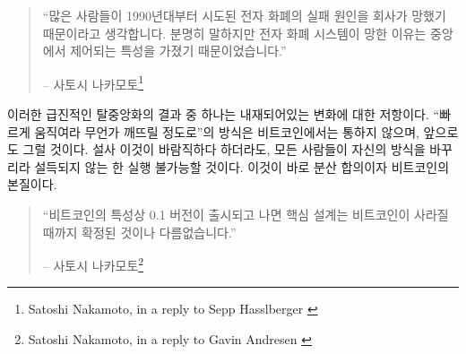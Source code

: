 \begin{quotation}\begin{samepage}
	\begin{comment}
		\enquote{A lot of people automatically dismiss e-currency as a lost cause
			because of all the companies that failed since the 1990's. I hope it's
			obvious it was only the centrally controlled nature of those systems
			that doomed them.}
		\begin{flushright} -- Satoshi Nakamoto\footnote{Satoshi Nakamoto, in a reply to Sepp Hasslberger \cite{satoshi-centralized-nature}}
		\end{comment}
		\enquote{많은 사람들이 1990년대부터 시도된 전자 화폐의 실패 원인을 회사가 망했기 때문이라고 생각합니다.
			분명히 말하지만 전자 화폐 시스템이 망한 이유는 중앙에서 제어되는 특성을 가졌기 때문이었습니다.}
		\begin{flushright} -- 사토시 나카모토\footnote{Satoshi Nakamoto, in a reply to Sepp Hasslberger \cite{satoshi-centralized-nature}}
\end{flushright}\end{samepage}\end{quotation}
	
\begin{comment}
	One consequence of this radical decentralization is an inherent
	resistance to change. \enquote{Move fast and break things} does not and will
	never work on the Bitcoin base layer. Even if it would be desirable, it
	wouldn't be possible without convincing \textit{everyone} to change their ways.
	That's distributed consensus. That's the nature of Bitcoin.
\end{comment}
이러한 급진적인 탈중앙화의 결과 중 하나는 내재되어있는 변화에 대한 저항이다.
\enquote{빠르게 움직여라 무언가 깨뜨릴 정도로}의 방식은 비트코인에서는 통하지 않으며, 앞으로도 그럴 것이다.
설사 이것이 바람직하다 하더라도, 모든 사람들이 자신의 방식을 바꾸리라 설득되지 않는 한 실행 불가능할 것이다. 
이것이 바로 분산 합의이자 비트코인의 본질이다.


\begin{quotation}\begin{samepage}
	\begin{comment}
		\enquote{The nature of Bitcoin is such that once version 0.1 was released, the
			core design was set in stone for the rest of its lifetime.}
		\begin{flushright} -- Satoshi Nakamoto\footnote{Satoshi Nakamoto, in a reply to Gavin Andresen \cite{satoshi-centralized-nature}}
		\end{comment}
		\enquote{비트코인의 특성상 0.1 버전이 출시되고 나면 핵심 설계는 비트코인이 사라질 때까지 확정된 것이나 다름없습니다.}
		\begin{flushright} -- 사토시 나카모토\footnote{Satoshi Nakamoto, in a reply to Gavin Andresen \cite{satoshi-centralized-nature}}
\end{flushright}\end{samepage}\end{quotation}

